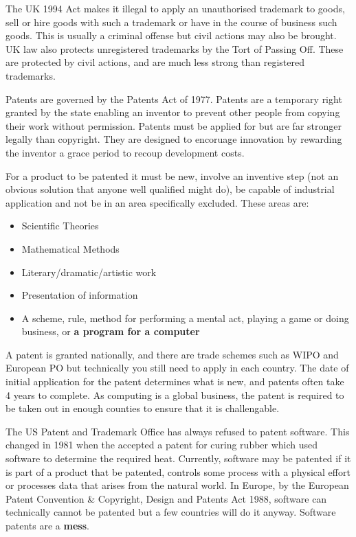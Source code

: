 \documentclass{article}
\begin{document}
	\par 
	The UK 1994 Act makes it illegal to apply an unauthorised trademark to goods, sell or hire goods with such a trademark or have in the course of business such goods. This is usually a criminal offense but civil actions may also be brought. UK law also protects unregistered trademarks by the Tort of Passing Off. These are protected by civil actions, and are much less strong than registered trademarks.
	
	Patents are governed by the Patents Act of 1977. Patents are a temporary right granted by the state enabling an inventor to prevent other people from copying their work without permission. Patents must be applied for but are far stronger legally than copyright. They are designed to encoruage innovation by rewarding the inventor a grace period to recoup development costs.
	
	\par 
	For a product to be patented it must be new, involve an inventive step (not an obvious solution that anyone well qualified might do), be capable of industrial application and not be in an area specifically excluded. These areas are:
	\begin{itemize}
	\item Scientific Theories
	\item Mathematical Methods
	\item Literary/dramatic/artistic work
	\item Presentation of information
	\item A scheme, rule, method for performing a mental act, playing a game or doing business, or \textbf{a program for a computer}
	\end{itemize}
	
	A patent is granted nationally, and there are trade schemes such as WIPO and European PO but technically you still need to apply in each country. The date of initial application for the patent determines what is new, and patents often take 4 years to complete. As computing is a global business, the patent is required to be taken out in enough counties to ensure that it is challengable.
	
	\par The US Patent and Trademark Office has always refused to patent software. This changed in 1981 when the accepted a patent for curing rubber which used software to determine the required heat. Currently, software may be patented if it is part of a product that be patented, controls some process with a physical effort or processes data that arises from the natural world. In Europe, by the European Patent Convention \& Copyright, Design and Patents Act 1988, software can technically cannot be patented but a few countries will do it anyway. Software patents are a \textbf{mess}.
	
\end{document}
